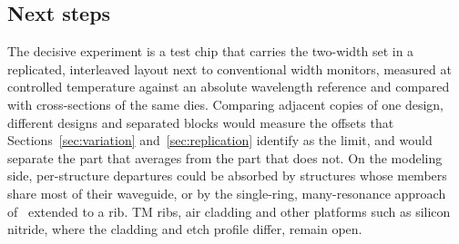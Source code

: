 \subsection{Next steps}

The decisive experiment is a test chip that carries the two-width set in a replicated, interleaved layout next to conventional width
monitors, measured at controlled temperature against an absolute wavelength reference and compared with
cross-sections of the same dies. Comparing adjacent copies of one design, different designs and separated blocks
would measure the offsets that Sections~\ref{sec:variation} and~\ref{sec:replication} identify as the limit, and
would separate the part that averages from the part that does not. On the modeling side, per-structure departures
could be absorbed by structures whose members share most of their waveguide, or by the single-ring, many-resonance
approach of~\cite{nrc2026} extended to a rib. TM ribs, air cladding and other platforms such as silicon nitride, where
the cladding and etch profile differ, remain open.

